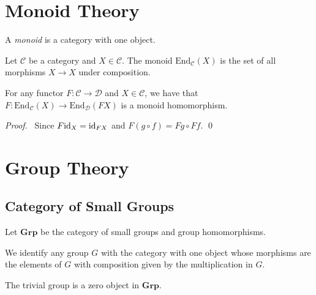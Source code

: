 \newcommand{\ket}[1]{\ensuremath{\left| {#1} \right\rangle}}
\newcommand{\bra}[1]{\ensuremath{\left\langle {#1} \right|}}

\chapter{Monoid Theory}

\begin{df}[Monoid]
A \emph{monoid} is a category with one object.
\end{df}

\begin{df}
Let $\mathcal{C}$ be a category and $X \in \mathcal{C}$. The monoid $\mathrm{End}_\mathcal{C}(X)$ is the set of all morphisms $X \rightarrow X$ under composition.
\end{df}

\begin{prop}
For any functor $F : \mathcal{C} \rightarrow \mathcal{D}$ and $X \in \mathcal{C}$, we have that $F : \mathrm{End}_\mathcal{C}(X) \rightarrow \mathrm{End}_\mathcal{D}(FX)$ is a monoid homomorphism.
\end{prop}

\begin{proof}
\pf\ Since $F \mathrm{id}_{X} = \mathrm{id}_{FX}$ and $F(g \circ f) = Fg \circ Ff$. \qed
\end{proof}

\chapter{Group Theory}

\section{Category of Small Groups}

\begin{df}
Let $\mathbf{Grp}$ be the category of small groups and group homomorphisms.
\end{df}

\begin{df}
We identify any group $G$ with the category with one object whose morphisms are the elements of $G$ with composition given by the multiplication in $G$.
\end{df}

\begin{prop}
The trivial group is a zero object in $\mathbf{Grp}$.
\end{prop}

